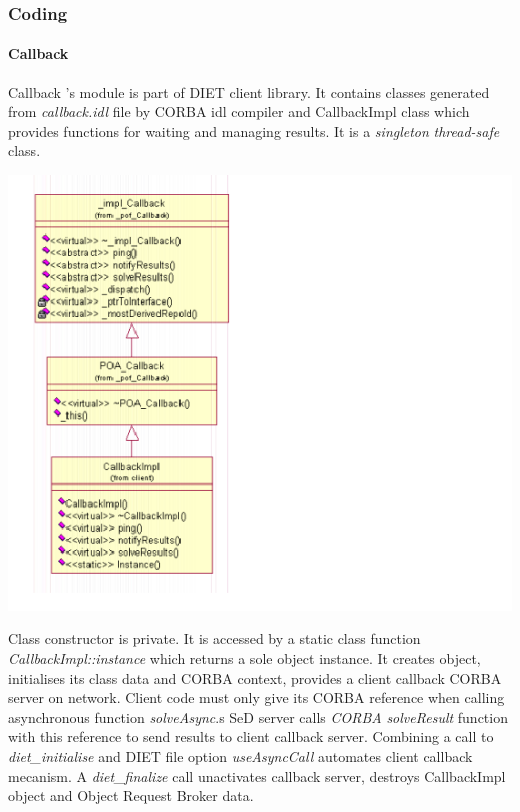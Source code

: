   \subsubsection{Coding}
  \paragraph{Callback}
  Callback 's module is part of DIET client library. It contains classes generated
  from \emph{callback.idl} file by CORBA idl compiler and CallbackImpl class
  which provides functions for waiting and managing results. It is a \emph{singleton}
  \emph{thread-safe} class.

  \includegraphics{./fig/CorbaClientClassDIagram}

  Class constructor is private. It is accessed by a static class function
  \emph{CallbackImpl::instance} which returns a sole object instance. It
  creates object, initialises its class data and CORBA context, provides a
  client callback CORBA server on network.
  Client code must only give its CORBA reference when calling asynchronous
  function \emph{solveAsync}.s
  SeD server calls \emph{CORBA} \emph{solveResult} function with this
  reference to send results to client callback server.
  Combining  a call to \emph{diet\_initialise} and DIET file option
  \emph{useAsyncCall} automates client callback mecanism.
  A \emph{diet\_finalize} call unactivates callback server, destroys
  CallbackImpl object and Object Request Broker data.

